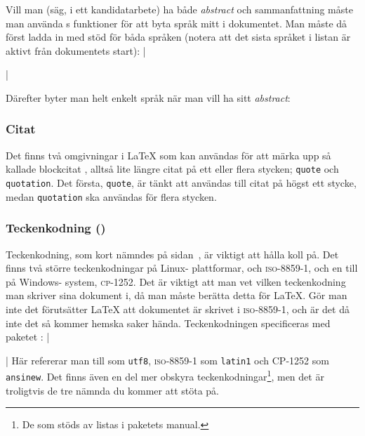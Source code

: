 \documentclass[../../latex.tex]{subfiles}
\begin{document}
Vill man (säg, i ett kandidatarbete) ha både \emph{abstract} och
sammanfattning måste man använda s funktioner för att byta
språk mitt i dokumentet. Man måste då först ladda in  med stöd 
för båda språken (notera att det sista språket i listan är aktivt från
dokumentets start):
\latex|\usepackage[english,swedish]{babel}|

	Därefter byter man helt enkelt språk när man vill ha sitt \emph{abstract}:
\begin{latexcode}
\begin{otherlanguage}{english}
\begin{abstract}
\end{abstract}
\end{otherlanguage}
\begin{abstract}
\end{abstract}
\end{latexcode}

\subsubsection{Citat}
Det finns två omgivningar i \LaTeX{} som kan användas för att märka upp
så kallade blockcitat , alltså lite längre citat på ett
eller flera stycken; \texttt{quote} och \texttt{quotation}. Det första,
\texttt{quote}, är tänkt att användas till citat på högst ett stycke,
medan \texttt{quotation} ska användas för flera stycken.

\subsubsection{Teckenkodning (\UTF)}
Teckenkodning, som kort nämndes på sidan~, är
viktigt att hålla koll på. Det finns två större teckenkodningar på Linux-%
plattformar, \UTF{} och \textsc{iso-8859-1}, och en till på Windows-%
system, \textsc{cp-1252}. Det är viktigt att man vet vilken teckenkodning
man skriver sina dokument i, då man måste berätta detta för \LaTeX. Gör
man inte det förutsätter \LaTeX{} att dokumentet är skrivet i
\textsc{iso-8859-1}, och är det då inte det så kommer hemska saker hända.
Teckenkodningen specificeras med paketet :
\latex|\usepackage[<teckenkodning>]{inputenc}|
Här refererar man till \UTF{} som \texttt{utf8}, \textsc{iso-8859-1} som
\texttt{latin1} och \textsc{CP-1252} som \texttt{ansinew}. Det finns även
en del mer obskyra teckenkodningar\footnote{De som stöds av 
 listas i paketets manual.}, men det är troligtvis de tre
nämnda du kommer att stöta på.
\end{document}
